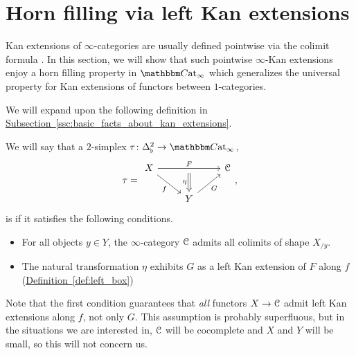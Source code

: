 \documentclass[main.tex]{subfiles}
\begin{document}
\section{Horn filling via left Kan extensions}
\label{sec:horn_filling_via_left_kan_extensions}

Kan extensions of $\infty$-categories are usually defined pointwise via the colimit formula \cite{highertopostheory} \cite{cisinski2019higher}. In this section, we will show that such pointwise $\infty$-Kan extensions enjoy a horn filling property in $\ICCat$ which generalizes the universal property for Kan extensions of functors between $1$-categories.

We will expand upon the following definition in \hyperref[ssc:basic_facts_about_kan_extensions]{Subsection~\ref*{ssc:basic_facts_about_kan_extensions}}.

\begin{definition}
  \label{def:left_kan}
  We will say that a $2$-simplex $\tau\colon \Delta^{2}_{\flat} \to \ICCat$,
  \begin{equation}
    \label{eq:prototypical_left_kan_simplex}
    \tau =
    \begin{tikzcd}
      X
      \arrow[dr, swap, "f"]
      \arrow[rr, "F", ""{below, name=M}]
      && \category{C}
      \\
      & Y
      \arrow[ur, swap, "G"]
      \arrow[from=M, Rightarrow, swap, "\eta"]
    \end{tikzcd},
  \end{equation}
  is  if it satisfies the following conditions.
  \begin{itemize}
    \item For all objects $y \in Y$, the $\infty$-category $\mathcal{C}$ admits all colimits of shape $X_{/y}$.

    \item The natural transformation $\eta$ exhibits $G$ as a left Kan extension of $F$ along $f$ (\hyperref[def:left_box]{Definition~\ref*{def:left_box}})
  \end{itemize}
\end{definition}

\begin{note}
  Note that the first condition guarantees that \emph{all} functors $X \to \mathcal{C}$ admit left Kan extensions along $f$, not only $G$. This assumption is probably superfluous, but in the situations we are interested in, $\mathcal{C}$ will be cocomplete and $X$ and $Y$ will be small, so this will not concern us.
\end{note}
\end{document}
